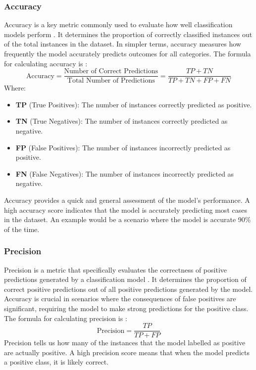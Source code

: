 \documentclass[12pt, a4paper,oneside]{book}
\numberwithin{equation}{section}
\begin{document}
\subsubsection{Accuracy}

Accuracy is a key metric commonly used to evaluate how well classification models perform \cite{alpaydine2020}. It determines the proportion of correctly classified instances out of the total instances in the dataset. In simpler terms, accuracy measures how frequently the model accurately predicts outcomes for all categories. The formula for calculating accuracy is \cite{kumar2024} \cite{powers2011}:
\[\text{Accuracy} = \frac{\text{Number of Correct Predictions}}{\text{Total Number of Predictions}} = \frac{TP + TN}{TP + TN + FP + FN}\]
Where:
\begin{itemize}
    \item \textbf{TP} (True Positives): The number of instances correctly predicted as positive.
    \item \textbf{TN} (True Negatives): The number of instances correctly predicted as negative.
    \item \textbf{FP} (False Positives): The number of instances incorrectly predicted as positive.
    \item \textbf{FN} (False Negatives): The number of instances incorrectly predicted as negative.
\end{itemize}
Accuracy provides a quick and general assessment of the model's performance. A high accuracy score indicates that the model is accurately predicting most cases in the dataset. An example would be a scenario where the model is accurate 90\% of the time.

\subsubsection{Precision}

Precision is a metric that specifically evaluates the correctness of positive predictions generated by a classification model \cite{sokolova2009}. It determines the proportion of correct positive predictions out of all positive predictions generated by the model. Accuracy is crucial in scenarios where the consequences of false positives are significant, requiring the model to make strong predictions for the positive class. The formula for calculating precision is \cite{kumar2024} \cite{powers2011}:
\[\text{Precision} = \frac{TP}{TP + FP}\]
Precision tells us how many of the instances that the model labelled as positive are actually positive. A high precision score means that when the model predicts a positive class, it is likely correct.
\end{document}
